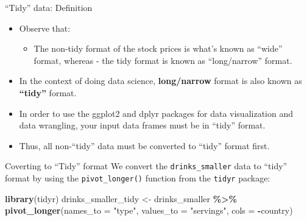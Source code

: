 \documentclass[
  ignorenonframetext,
]{beamer}
\newenvironment{Shaded}{\begin{snugshade}}{\end{snugshade}}
\newcommand{\AttributeTok}[1]{\textcolor[rgb]{0.13,0.29,0.53}{#1}}
\newcommand{\FunctionTok}[1]{\textcolor[rgb]{0.13,0.29,0.53}{\textbf{#1}}}
\newcommand{\NormalTok}[1]{#1}
\newcommand{\OtherTok}[1]{\textcolor[rgb]{0.56,0.35,0.01}{#1}}
\newcommand{\SpecialCharTok}[1]{\textcolor[rgb]{0.81,0.36,0.00}{\textbf{#1}}}
\newcommand{\StringTok}[1]{\textcolor[rgb]{0.31,0.60,0.02}{#1}}
\providecommand{\tightlist}{%
  \setlength{\itemsep}{0pt}\setlength{\parskip}{0pt}}
\begin{document}
\begin{frame}{``Tidy'' data: Definition}
\protect\hypertarget{tidy-data-definition-2}{}
\begin{itemize}
\item
  Observe that:

  \begin{itemize}
  \tightlist
  \item
    The non-tidy format of the stock prices is what's known as ``wide''
    format, whereas - the tidy format is known as ``long/narrow''
    format.
  \end{itemize}
\item
  In the context of doing data science, \textbf{long/narrow} format is
  also known as \textbf{``tidy''} format.
\item
  In order to use the ggplot2 and dplyr packages for data visualization
  and data wrangling, your input data frames must be in ``tidy'' format.
\item
  Thus, all non-``tidy'' data must be converted to ``tidy'' format
  first.
\end{itemize}
\end{frame}

\begin{frame}[fragile]{Coverting to ``Tidy'' format}
\protect\hypertarget{coverting-to-tidy-format}{}
We convert the \texttt{drinks\_smaller} data to ``tidy'' format by using
the \texttt{pivot\_longer()} function from the \texttt{tidyr} package:

\normalsize

\begin{Shaded}
\begin{Highlighting}[]
\FunctionTok{library}\NormalTok{(tidyr)}
\NormalTok{drinks\_smaller\_tidy }\OtherTok{\textless{}{-}}\NormalTok{ drinks\_smaller }\SpecialCharTok{\%\textgreater{}\%} 
  \FunctionTok{pivot\_longer}\NormalTok{(}\AttributeTok{names\_to =} \StringTok{"type"}\NormalTok{, }
               \AttributeTok{values\_to =} \StringTok{"servings"}\NormalTok{, }
               \AttributeTok{cols =} \SpecialCharTok{{-}}\NormalTok{country)}
\end{Highlighting}
\end{Shaded}

\normalsize
\end{frame}
\end{document}
